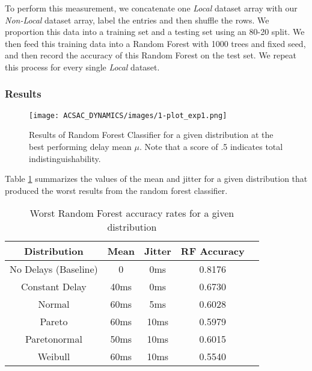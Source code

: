 \documentclass[sigconf]{acmart}
\begin{document}
To perform this measurement, we concatenate one \textit{Local} dataset array with our \textit{Non-Local} dataset array, label the entries and then shuffle the rows. We proportion this data into a training set and a testing set using an 80-20 split. We then feed this training data into a Random Forest with 1000 trees and fixed seed, and then record the accuracy of this Random Forest on the test set. We repeat this process for every single \textit{Local} dataset.

\subsubsection*{Results}


\begin{figure}
\captionsetup{justification=centering}
\centering
\texttt{[image: ACSAC\_DYNAMICS/images/1-plot\_exp1.png]}
\caption{Results of Random Forest Classifier for a given distribution at the best performing delay mean $\mu$. Note that a score of .5 indicates total indistinguishability.}
\label{Fig:rf_graph}
\end{figure}

Table \ref{tab:results-iat_rf} summarizes the values of the mean and jitter for a given distribution that produced the worst results from the random forest classifier.


\begin{table}[ht!]
\begin{center}
\begin{small}
\begin{sc}
\begin{tabular}{ccccc}
\hline
Distribution & Mean & Jitter & RF Accuracy\\
\hline
No Delays (Baseline) & 0 & 0ms & 0.8176 \\
Constant Delay & 40ms & 0ms & 0.6730 \\
Normal & 60ms & 5ms & 0.6028 \\
Pareto & 60ms & 10ms & 0.5979 \\
Paretonormal & 50ms & 10ms & 0.6015 \\
Weibull & 60ms & 10ms & 0.5540 \\
\hline
\end{tabular}
\end{sc}
\end{small}
\caption{Worst Random Forest accuracy rates for a given distribution}
\label{tab:results-iat_rf}
\end{center}
\vskip -4mm
\end{table}
\end{document}
